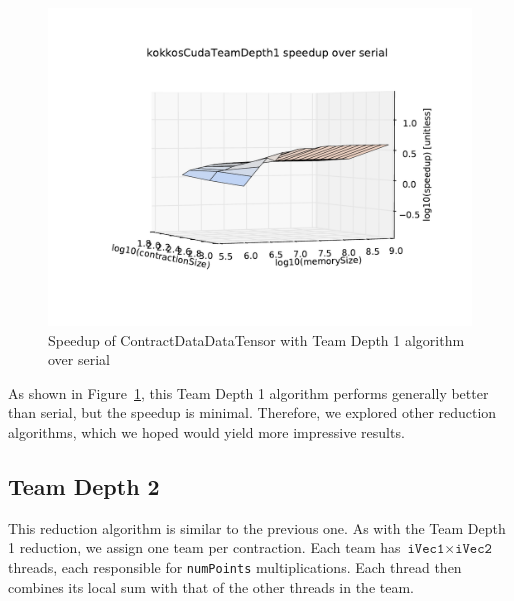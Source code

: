 \begin{figure}[ht]
    \includegraphics[scale=.55]{./VersusSerial_kokkosCudaTeamDepth1_clearCache_shadowfax.pdf}
\caption{Speedup of ContractDataDataTensor with Team Depth 1 algorithm over
    serial
\label{fig:ContractDataDataTensorDepth1}} 
\end{figure}

As shown in Figure~\ref{fig:ContractDataDataTensorDepth1}, this Team Depth 1
algorithm performs generally better than serial, but the speedup is minimal.
Therefore, we explored other reduction algorithms, which we hoped would yield
more impressive results.

\subsection{Team Depth 2}
    This reduction algorithm is similar to the previous one.  As with the Team
    Depth 1 reduction, we assign one team per contraction.  Each team has
    $\texttt{iVec1} \times \texttt{iVec2}$ threads, each responsible for
    \texttt{numPoints} multiplications.  Each thread then combines its local sum
    with that of the other threads in the team.

